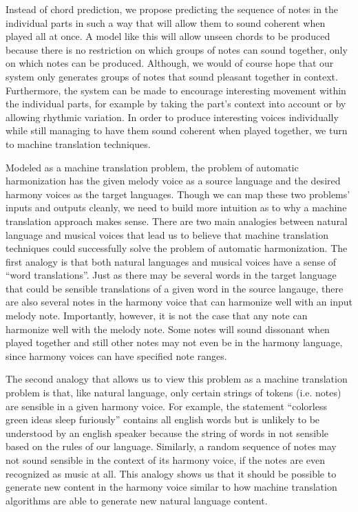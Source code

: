 \documentclass{sig-alternate}
\begin{document}
Instead of chord prediction, we propose predicting the sequence of notes in the individual parts in such a way that will allow them to sound coherent when played all at once. A model like this will allow unseen chords to be produced because there is no restriction on which groups of notes can sound together, only on which notes can be produced. Although, we would of course hope that our system only generates groups of notes that sound pleasant together in context. Furthermore, the system can be made to encourage interesting movement within the individual parts, for example by taking the part's context into account or by allowing rhythmic variation. In order to produce interesting voices individually while still managing to have them sound coherent when played together, we turn to machine translation techniques.

Modeled as a machine translation problem, the problem of automatic harmonization has the given melody voice as a source language 
and the desired harmony voices as the target languages. Though we can map these two problems' inputs and outputs cleanly, we
need to build more intuition as to why a machine translation approach makes sense. There are two main analogies between natural language and musical voices that lead us to believe that machine translation techniques could successfully solve the problem of automatic harmonization. The first analogy is that both natural languages and musical voices have a sense of ``word translations''. Just as there may be several words in the target language that could be sensible translations of a given word in the source 
langauge, there are also several notes in the harmony voice that can harmonize well with an input melody note. Importantly, 
however, it is not the case that any note can harmonize well with the melody note. Some notes will sound dissonant when played together and still other notes may not even be in the harmony language, since harmony voices can have specified note
ranges. 

The second analogy that allows us to view this problem as a machine translation problem is that, like 
natural language, only certain strings of tokens (i.e. notes) are sensible in a given harmony voice. For example,
the statement ``colorless green ideas sleep furiously'' contains all english words but is unlikely to
be understood by an english speaker because the string of words in not sensible based on the rules of our
language. Similarly, a random sequence of notes may not sound sensible in the context of its
harmony voice, if the notes are even recognized as music at all. This analogy shows us that it should be
possible to generate new content in the harmony voice similar to how machine translation algorithms are 
able to generate new natural language content.
\end{document}
